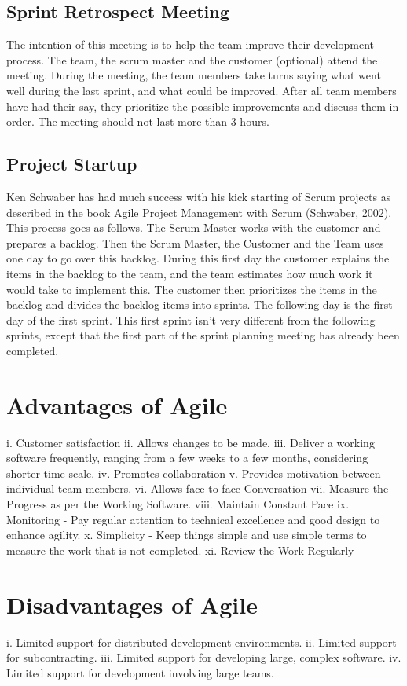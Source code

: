 \documentclass[a4paper, 12pt]{report}
\begin{document}
\subsection{Sprint Retrospect Meeting} 
The intention of this meeting is to help the team improve their development process. The team,
the scrum master and the customer (optional) attend the meeting. During the meeting, the team
members take turns saying what went well during the last sprint, and what could be improved.
After all team members have had their say, they prioritize the possible improvements and discuss
them in order. The meeting should not last more than 3 hours.
\subsection{Project Startup} 
Ken Schwaber has had much success with his kick starting of Scrum projects as described in the
book Agile Project Management with Scrum (Schwaber, 2002). This process goes as follows.
The Scrum Master works with the customer and prepares a backlog. Then the Scrum Master, the
Customer and the Team uses one day to go over this backlog. During this first day the customer
explains the items in the backlog to the team, and the team estimates how much work it would
take to implement this. The customer then prioritizes the items in the backlog and divides the
backlog items into sprints. The following day is the first day of the first sprint. This first sprint
isn’t very different from the following sprints, except that the first part of the sprint planning
meeting has already been completed.
\section{Advantages of Agile} 
i. Customer satisfaction
ii. Allows changes to be made.
iii. Deliver a working software frequently, ranging from a few weeks to a few months,
considering shorter time-scale.
iv. Promotes collaboration
v. Provides motivation between individual team members.
vi. Allows face-to-face Conversation
vii. Measure the Progress as per the Working Software.
viii. Maintain Constant Pace
ix. Monitoring - Pay regular attention to technical excellence and good design to enhance
agility.
x. Simplicity - Keep things simple and use simple terms to measure the work that is not
completed.
xi. Review the Work Regularly
\section{Disadvantages of Agile} 
i. Limited support for distributed development environments.
ii. Limited support for subcontracting.
iii. Limited support for developing large, complex software.
iv. Limited support for development involving large teams.
\end{document}
